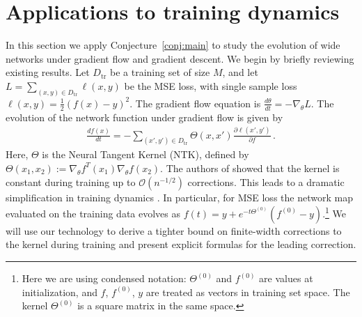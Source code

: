 \documentclass[english]{article}
\newcommand{\dho}{\partial}
\newcommand{\cO}{\ensuremath{\mathcal{O}}}
\newcommand{\es}[2] {\begin{align} \label{#1} #2 \end{align}}
\newcommand{\pcite}[1]{\cite{#1}}
\begin{document}
\section{Applications to training dynamics}
\label{sec:applications}

In this section we apply Conjecture~\ref{conj:main} to study the evolution of wide networks under gradient flow and gradient descent.
We begin by briefly reviewing existing results.
\newcommand{\Dtr}{D_{\mathrm{tr}}}
Let $\Dtr$ be a training set of size $M$, and let $L = \sum_{(x,y) \in \Dtr} \ell(x, y)$ be the MSE loss, with single sample loss $\ell(x,y) = \frac{1}{2} (f(x) - y)^2$.
The gradient flow equation is $\frac{d\theta}{dt} = -\nabla_\theta L$.
The evolution of the network function under gradient flow is given by
\es{NTK}{
  \frac{df(x)}{dt}=-\sum_{(x',y') \in \Dtr}\Theta(x,x') \frac{\dho \ell(x',y')}{\dho f}  \,.
}
Here, $\Theta$ is the Neural Tangent Kernel (NTK), defined by 
$ \Theta(x_1, x_2) := \nabla_\theta f^T(x_1) \nabla_\theta f(x_2) $.
The authors of \cite{ntk} showed that the kernel is constant during training up to $\cO(n^{-1/2})$ corrections.
This leads to a dramatic simplification in training dynamics \pcite{ntk,2019arXiv190206720L}.
In particular, for MSE loss the network map evaluated on the training data evolves as
$f(t)=y+e^{-t\Theta^{(0)}}(f^{(0)}-y)$.\footnote{
  Here we are using condensed notation:
  $\Theta^{(0)}$ and $f^{(0)}$ are values at initialization, and $f$, $f^{(0)}$, $y$ are treated as vectors in training set space. The kernel $\Theta^{(0)}$ is a square matrix in the same space.
}
We will use our technology to derive a tighter bound on finite-width corrections to the kernel during training and present explicit formulas for the leading correction.
\end{document}
